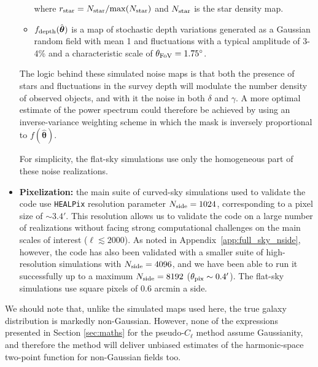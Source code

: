 \documentclass[usenatbib]{mnrasb}
\newcommand{\nv}{\hat{\boldsymbol{\theta}}}
\begin{document}
\begin{itemize}
\begin{itemize}
            where $r_{\rm star}=N_{\rm star}/{\rm max}(N_{\rm star})$ and $N_{\rm star}$ is the star density map.
            \item $f_{\rm depth}(\nv)$ is a map of stochastic depth variations generated as a Gaussian random field with mean 1 and fluctuations with a typical amplitude of 3-4\% and a characteristic scale of $\theta_{\rm FoV}=1.75^\circ$.
          \end{itemize}
          The logic behind these simulated noise maps is that both the presence of stars and fluctuations in the survey depth will modulate the number density of observed objects, and with it the noise in both $\delta$ and $\gamma$. A more optimal estimate of the power spectrum could therefore be achieved by using an inverse-variance weighting scheme in which the mask is inversely proportional to $f(\nv)$.
          
          For simplicity, the flat-sky simulations use only the homogeneous part of these noise realizations.

          \item {\bf Pixelization:} the main suite of curved-sky simulations used to validate the code use \texttt{HEALPix} resolution parameter $N_{\rm side}=1024$, corresponding to a pixel size of $\sim3.4'$. This resolution allows us to validate the code on a large number of realizations without facing strong computational challenges on the main scales of interest ($\ell\lesssim2000$).  As noted in Appendix~\ref{app:full_sky_nside}, however, the code has also been validated with a smaller suite of high-resolution simulations with $N_{\rm side}=4096$, and we have been able to run it successfully up to a maximum $N_{\rm side}=8192$ ($\theta_{\rm pix}\sim0.4'$). The flat-sky simulations use square pixels of $0.6$ arcmin a side.
        \end{itemize}
        
        We should note that, unlike the simulated maps used here, the true galaxy distribution is markedly non-Gaussian. However, none of the expressions presented in Section \ref{sec:maths} for the pseudo-$C_\ell$ method assume Gaussianity, and therefore the method will deliver unbiased estimates of the harmonic-space two-point function for non-Gaussian fields too.
        
\end{document}
